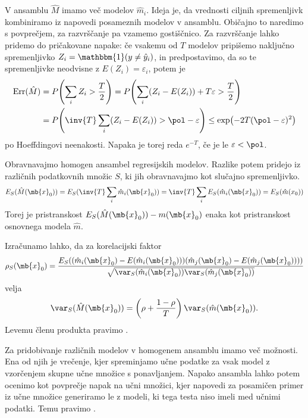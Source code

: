 
V ansamblu $\hat{M}$ imamo več modelov $\hat{m}_i$.
Ideja je, da vrednosti ciljnih spremenljivk kombiniramo iz napovedi posameznih
modelov v ansamblu.
Običajno to naredimo s povprečjem, za razvrščanje pa vzamemo gostiščnico.
Za razvrščanje lahko pridemo do pričakovane napake:
če vsakemu od $T$ modelov pripišemo naključno spremenljivko $Z_i = \mathbbm{1}(y
\ne \hat{y}_i)$, in predpostavimo, da so te spremenljivke neodvisne z $E(Z_i) =
\varepsilon_i$, potem je
\begin{align*}
  \operatorname{Err}(\hat{M})
  &= P\!\left( \sum_i Z_i > \frac{T}{2} \right)
  = P\!\left( \sum_i (Z_i - E(Z_i)) + T \varepsilon > \frac{T}{2} \right) \\
  &= P\!\left( \inv{T} \sum_i (Z_i - E(Z_i)) > \pol - \varepsilon \right)
  \le \exp\!\left( -2 T (\pol - \varepsilon)^2 \right)
\end{align*}
po Hoeffdingovi neenakosti.
Napaka je torej reda $e^{-T}$, če je le $\varepsilon < \pol$.


Obravnavajmo homogen ansambel regresijskih modelov.
Razlike potem pridejo iz različnih podatkovnih množic $S$, ki jih obravnavajmo
kot slučajno spremenljivko.
\[
  E_S(\hat{M}(\mb{x}_0))
  = E_S(\inv{T} \sum_i \hat{m}_i(\mb{x}_0))
  = \inv{T} \sum_i E_S(\hat{m}_i(\mb{x}_0))
  = E_S(\hat{m}(x_0))
\]
Torej je pristranskost $E_S(\hat{M}(\mb{x}_0)) - m(\mb{x}_0)$ enaka kot
pristranskost osnovnega modela $\hat{m}$.


Izračunamo lahko, da za korelacijski faktor
\[
  \rho_S(\mb{x}_0)
  = \frac{E_S((\hat{m}_i(\mb{x}_0) - E(\hat{m}_i(\mb{x}_0))) (\hat{m}_j(\mb{x}_0) -
	E(\hat{m}_j(\mb{x}_0))))}{\sqrt{ \var_S(\hat{m}_i(\mb{x}_0))
	  \var_S(\hat{m}_j(\mb{x}_0)) }}
\]
velja
\[
  \var_S(\hat{M}(\mb{x}_0))
  = \left( \rho + \frac{1-\rho}{T} \right) \var_S(\hat{m}(\mb{x}_0)).
\]
Levemu členu produkta pravimo .


Za pridobivanje različnih modelov v homogenem ansamblu imamo več možnosti.
Ena od njih je vrečenje, kjer spreminjamo učne podatke za vsak model z
vzorčenjem skupne učne množice s ponavljanjem.
Napako ansambla lahko potem ocenimo kot povprečje napak na učni množici, kjer
napovedi za posamičen primer iz učne množice generiramo le z modeli, ki tega
testa niso imeli med učnimi podatki.
Temu pravimo .

